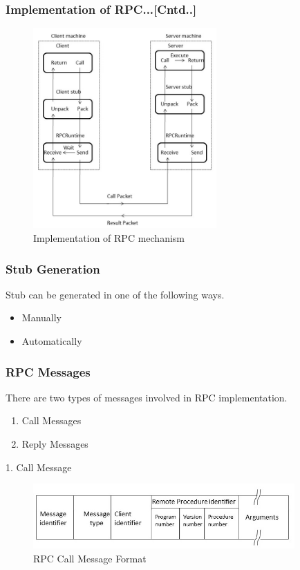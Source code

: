 \documentclass{beamer}
\begin{document}
\begin{frame}
	\frametitle{Implementation of RPC...[Cntd..]}
	\begin{figure}
		\centering
		\includegraphics[width=7cm]{fig42.jpg}
		\caption{Implementation of RPC mechanism}
	\end{figure}
\end{frame}


\begin{frame}
	\frametitle{Stub Generation}
	Stub can be generated in one of the following ways.
	\begin{itemize}
		\item Manually
		\item Automatically
	\end{itemize}
	\vspace{6cm}
\end{frame}

\begin{frame}
	\frametitle{RPC Messages}
	There are two types of messages involved in RPC implementation.
	\begin{enumerate}
		\item Call Messages
		\item Reply Messages
	\end{enumerate}
	\vspace{1cm}
	1. Call Message\\
	\begin{figure}
		\centering
		\includegraphics[width=10cm]{fig43.jpg}
		\caption{RPC Call Message Format}
	\end{figure}
\end{frame}
\end{document}

